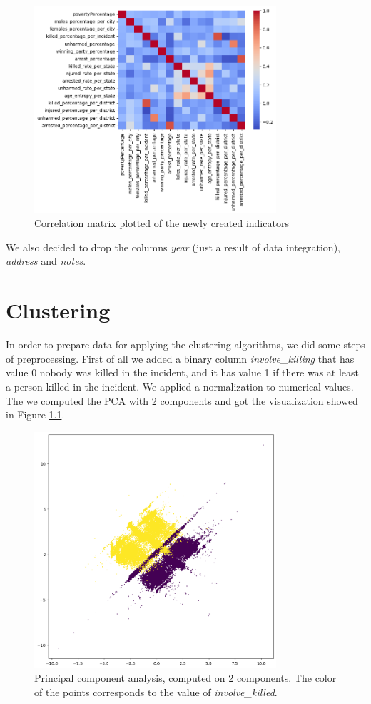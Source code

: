 \documentclass[11pt,a4paper]{report}
\begin{document}
\begin{figure}[h]
	\includegraphics[width=0.8\textwidth]{corr_matrix_indicators}
	\centering
	\caption{Correlation matrix plotted of the newly created indicators}
	\label{corr_matrix_indicators}
\end{figure}

We also decided to drop the columns \textit{year} (just a result of data integration), \textit{address} and \textit{notes}.

\chapter{Clustering}

In order to prepare data for applying the clustering algorithms, we did some steps of preprocessing.
First of all we added a binary column \textit{involve\_killing} that has value 0 nobody was killed in the incident, and it has value 1 if there was at least a person killed in the incident.
We applied a normalization to numerical values.
The we computed the PCA with 2 components and got the visualization showed in Figure \ref{pca}.

\begin{figure}[h]
	\includegraphics[width=0.8\textwidth]{pca}
	\centering
	\caption{Principal component analysis, computed on 2 components.
	The color of the points corresponds to the value of \textit{involve\_killed}.}
	\label{pca}
\end{figure}
\end{document}
